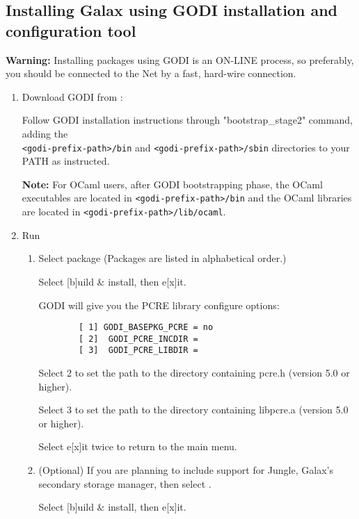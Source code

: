 \subsection{
Installing Galax using GODI installation and configuration tool}

\textbf{Warning:} Installing packages using GODI is an ON-LINE process, so
preferably, you should be connected to the Net by a fast, hard-wire
connection.

\begin{enumerate}
\item Download GODI from : 

Follow GODI installation instructions through "bootstrap\_stage2"
command, adding the\\\verb+<godi-prefix-path>/bin+ and
\verb+<godi-prefix-path>/sbin+ directories to your PATH as instructed.

\textbf{Note:} For OCaml users, after GODI bootstrapping phase, the
OCaml executables are located in \verb+<godi-prefix-path>/bin+ and the
OCaml libraries are located in \verb+<godi-prefix-path>/lib/ocaml+.

\item Run 

  \begin{enumerate}
    \item Select  package (Packages are listed in
         alphabetical order.)

    Select [b]uild \& install, then e[x]it.

    GODI will give you the PCRE library configure options:

\begin{verbatim}
        [ 1] GODI_BASEPKG_PCRE = no
        [ 2]  GODI_PCRE_INCDIR =
        [ 3]  GODI_PCRE_LIBDIR =
\end{verbatim}

Select 2 to set the path to the directory containing pcre.h (version 5.0 or higher).

Select 3 to set the path to the directory containing libpcre.a (version 5.0 or higher).

Select e[x]it twice to return to the main menu.

\item (Optional) If you are planning to include support for Jungle,
Galax's secondary storage manager, then select .

     Select [b]uild \& install, then e[x]it.


\end{enumerate}
\end{enumerate}
